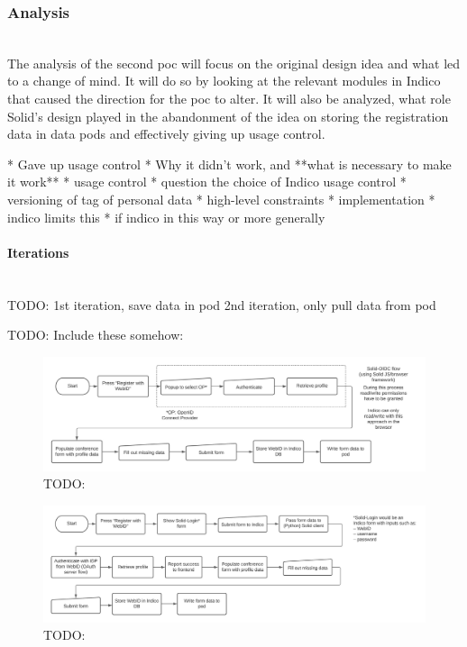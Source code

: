 \subsubsection{Analysis}\label{poc2:analysis}\mbox{}\\

The analysis of the second \gls{poc} will focus on the original design idea and what led to a change of mind. It will do so by looking at the relevant modules in Indico that caused the direction for the \gls{poc} to alter. It will also be analyzed, what role Solid's design played in the abandonment of the idea on storing the registration data in data pods and effectively giving up usage control.



* Gave up usage control
  * Why it didn't work, and **what is necessary to make it work**
    * usage control
    * question the choice of Indico usage control
    * versioning of tag of personal data
* high-level constraints
* implementation
  * indico limits this
* if indico in this way or more generally

\vspace{0.5cm}
\paragraph{Iterations}\mbox{}\\
TODO:
1st iteration, save data in pod
2nd iteration, only pull data from pod

TODO: Include these somehow:

\begin{figure}
    \centering
    \includegraphics[width=1\textwidth]{prototype/graphs/poc-conference_registration_flow-client_side-sideways.jpeg}
    \caption{TODO:}
    \label{fig:poc-conference_registration_flow-client_side-sideways}
\end{figure}

\begin{figure}
    \centering
    \includegraphics[width=1\textwidth]{prototype/graphs/poc-conference_registration_flow-server_side-sideways.jpeg}
    \caption{TODO:}
    \label{fig:poc-conference_registration_flow-server_side-sideways}
\end{figure}


